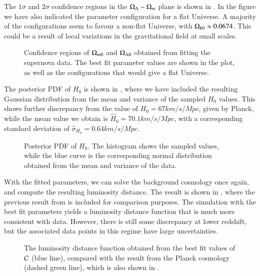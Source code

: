 The $1\sigma$ and $2\sigma$ confidence regions in the $\Omega_{\Lambda}-\Omega_{m}$ plane is shown in . In the figure we have also indicated the parameter configuration for a flat Universe. A majority of the configurations seem to favour a non-flat Universe, with $\Omega_{k0}\approx 0.0674$. This could be a result of local variations in the gravitational field at small scales.      
\begin{figure}[ht!]
    \caption{Confidence regions of $\Omega_{m0}$ and $\Omega_{\Lambda 0}$ obtained from fitting the supernova data. The best fit parameter values are shown in the plot, as well as the configurations that would give a flat Universe.}
    \label{fig:M1:results:mcmc_supernova_fit_Nburn1000}
\end{figure}

The posterior PDF of $H_0$ is shown in , where we have included the resulting Gaussian distribution from the mean and variance of the sampled $H_0$ values. This shows further discrepancy from the value of $H_0=67\unit{km/s/Mpc}$, given by Planck, while the mean value we obtain is $\hat{H}_0=70.1\unit{km/s/Mpc}$, with a corresponding standard deviation of $\hat{\sigma}_{H_0}=0.64\unit{km/s/Mpc}$.       
\begin{figure}[ht!]
    \caption{Posterior PDF of $H_0$. The histogram shows the sampled values, while the blue curve is the corresponding normal distribution obtained from the mean and variance of the data.}
    \label{fig:M1:results:H0_pdf_Nburn1000}
\end{figure}


With the fitted parameters, we can solve the background cosmology once again, and compute the resulting luminosity distance. The result is shown in , where the previous result from  is included for comparison purposes. The simulation with the best fit parameters yields a luminosity distance function that is much more consistent with data. However, there is still some discrepancy at lower redshift, but the associated data points in this regime have large uncertainties.    
\begin{figure}[ht!]
    \caption{The luminosity distance function obtained from the best fit values of $\mathcal{C}$ (blue line), compared with the result from the Planck cosmology (dashed green line), which is also shown in .}
    \label{fig:M1:results:dL_z_compare_fitted}
\end{figure}


